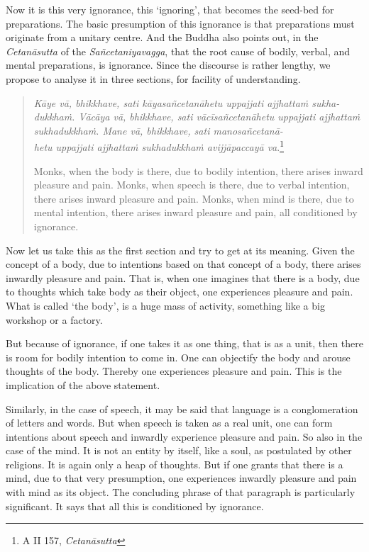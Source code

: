 Now it is this very ignorance, this `ignoring', that becomes the seed-bed for preparations. The basic presumption of this ignorance is that preparations must originate from a unitary centre. And the Buddha also points out, in the \emph{Cetanāsutta} of the \emph{Sañcetaniyavagga}, that the root cause of bodily, verbal, and mental preparations, is ignorance. Since the discourse is rather lengthy, we propose to analyse it in three sections, for facility of understanding.

\begin{quote}
\emph{Kāye vā, bhikkhave, sati kāyasañcetanāhetu uppajjati ajjhattaṁ sukha-\\ dukkhaṁ. Vācāya vā, bhikkhave, sati vācīsañcetanāhetu uppajjati ajjhattaṁ sukhadukkhaṁ. Mane vā, bhikkhave, sati manosañcetanā-\\ hetu uppajjati ajjhattaṁ sukhadukkhaṁ avijjāpaccayā va}.\footnote{A II 157, \emph{Cetanāsutta}}

Monks, when the body is there, due to bodily intention, there arises inward pleasure and pain. Monks, when speech is there, due to verbal intention, there arises inward pleasure and pain. Monks, when mind is there, due to mental intention, there arises inward pleasure and pain, all conditioned by ignorance.
\end{quote}

Now let us take this as the first section and try to get at its meaning. Given the concept of a body, due to intentions based on that concept of a body, there arises inwardly pleasure and pain. That is, when one imagines that there is a body, due to thoughts which take body as their object, one experiences pleasure and pain. What is called `the body', is a huge mass of activity, something like a big workshop or a factory.

But because of ignorance, if one takes it as one thing, that is as a unit, then there is room for bodily intention to come in. One can objectify the body and arouse thoughts of the body. Thereby one experiences pleasure and pain. This is the implication of the above statement.

Similarly, in the case of speech, it may be said that language is a conglomeration of letters and words. But when speech is taken as a real unit, one can form intentions about speech and inwardly experience pleasure and pain. So also in the case of the mind. It is not an entity by itself, like a soul, as postulated by other religions. It is again only a heap of thoughts. But if one grants that there is a mind, due to that very presumption, one experiences inwardly pleasure and pain with mind as its object. The concluding phrase of that paragraph is particularly significant. It says that all this is conditioned by ignorance.

